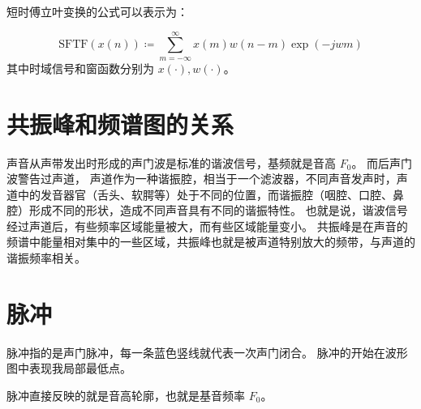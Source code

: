 短时傅立叶变换的公式可以表示为：

\begin{equation}
  \text{SFTF}(x(n)) \coloneqq \sum_{m=-\infty}^{\infty} x(m) w(n-m) \exp(-jwm)
\end{equation}
其中时域信号和窗函数分别为 $x(\cdot), w(\cdot)$。

\section{共振峰和频谱图的关系}
声音从声带发出时形成的声门波是标准的谐波信号，基频就是音高 $F_0$。
而后声门波警告过声道， 声道作为一种谐振腔，相当于一个滤波器，不同声音发声时，声道中的发音器官（舌头、软腭等）处于不同的位置，而谐振腔（咽腔、口腔、鼻腔）形成不同的形状，造成不同声音具有不同的谐振特性。
也就是说，谐波信号经过声道后，有些频率区域能量被大，而有些区域能量变小。
共振峰是在声音的频谱中能量相对集中的一些区域，共振峰也就是被声道特别放大的频带，与声道的谐振频率相关。

\section{脉冲}
脉冲指的是声门脉冲，每一条蓝色竖线就代表一次声门闭合。
脉冲的开始在波形图中表现我局部最低点。

脉冲直接反映的就是音高轮廓，也就是基音频率 $F_0$。
